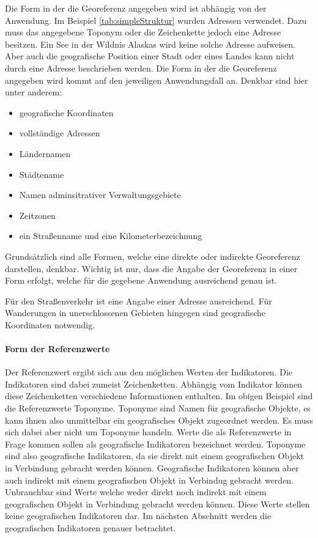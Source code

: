 				Die Form in der die Georeferenz angegeben wird ist abhängig von der Anwendung. 
				Im Beispiel \ref{tab:simpleStruktur} wurden Adressen verwendet. 
				Dazu muss das angegebene Toponym oder die Zeichenkette jedoch eine Adresse besitzen. 
				Ein See in der Wildnis Alaskas wird keine solche Adresse aufweisen.
				Aber auch die geografische Position einer Stadt oder eines Landes kann nicht durch eine Adresse beschrieben werden. 
				Die Form in der die Georeferenz angegeben wird kommt auf den jeweiligen Anwendungsfall an.
				Denkbar sind hier unter anderem:

				\begin{itemize}
				  	 \item geografische Koordinaten
				  	 \item vollständige Adressen
				  	 \item Ländernamen
				  	 \item Städtename
				  	 \item Namen adminsitrativer Verwaltungsgebiete 
				  	 \item Zeitzonen
				  	 \item ein Straßenname und eine Kilometerbezeichnung
				  \end{itemize}  

				  Grundsätzlich sind alle Formen, welche eine direkte oder indirekte Georeferenz darstellen, denkbar.
				  Wichtig ist nur, dass die Angabe der Georeferenz in einer Form erfolgt, welche für die gegebene Anwendung ausreichend genau ist.

				  Für den Straßenverkehr ist eine Angabe einer Adresse ausreichend.
				  Für Wanderungen in unerschlossenen Gebieten hingegen sind geografische Koordinaten notwendig. 

			\paragraph{Form der Referenzwerte}

				Der Referenzwert ergibt sich aus den möglichen Werten der Indikatoren.
				Die Indikatoren sind dabei zumeist Zeichenketten.
				Abhängig vom Indikator können diese Zeichenketten verschiedene Informationen enthalten.
				Im obigen Beispiel sind die Referenzwerte Toponyme.
				Toponyme sind Namen für geografische Objekte, es kann ihnen also unmittelbar ein geografisches Objekt zugeordnet werden.
				Es muss sich dabei aber nicht um Toponyme handeln.
				Werte die als Referenzwerte in Frage kommen sollen als geografische Indikatoren bezeichnet werden.
				Toponyme sind also geografische Indikatoren, da sie direkt mit einem geografischen Objekt in Verbindung gebracht werden können.
				Geografische Indikatoren können aber auch indirekt mit einem geografischen Objekt in Verbindug gebracht werden.
				Unbrauchbar sind Werte welche weder direkt noch indirekt mit einem geografischen Objekt in Verbindung gebracht werden können.
				Diese Werte stellen keine geografischen Indikatoren dar.
				Im nächsten Abschnitt werden die geografischen Indikatoren genauer betrachtet.

